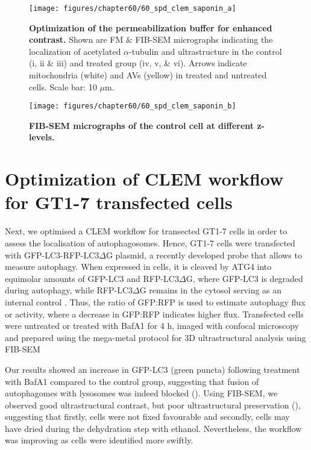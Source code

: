 \begin{landscape}
\begin{figure}[!htbp]
\center
 \texttt{[image: figures/chapter60/60\_spd\_clem\_saponin\_a]}
 \caption[Optimization of the permeabilization buffer for enhanced contrast]{\textbf{Optimization of the permeabilization buffer for enhanced contrast.} Shown are FM \& FIB-SEM micrographs indicating the localization of acetylated $\alpha$-tubulin and ultrastructure in the control (i, ii \& iii) and treated group (iv, v, \& vi). Arrows indicate mitochondria (white) and AVs (yellow) in treated and untreated cells. Scale bar: 10 $\mu$m.}
 \label{fig:60_spd_clem_saponin_a}
\end{figure} 
\end{landscape}

\begin{landscape}
\begin{figure}[!htbp]
\vspace{1.7cm}
\center
 \texttt{[image: figures/chapter60/60\_spd\_clem\_saponin\_b]}
 \caption[FIB-SEM micrographs of the control cell at different z-levels]{\textbf{FIB-SEM micrographs of the control cell at different z-levels.}}
 \label{fig:60_spd_clem_saponin_b}
\end{figure} 
\end{landscape}

\section{Optimization of CLEM workflow for GT1-7 transfected cells}
Next, we optimised a CLEM workflow for transected GT1-7 cells in order to assess the localisation of autophagosomes. Hence, GT1-7 cells were transfected with GFP-LC3-RFP-LC3$\Delta$G plasmid, a recently developed probe that allows to measure autophagy. When expressed in cells, it is cleaved by ATG4 into equimolar amounts of GFP-LC3 and RFP-LC3$\Delta$G, where GFP-LC3 is degraded during autophagy, while RFP-LC3$\Delta$G remains in the cytosol serving as an internal control \citep{Kaizuka2016}. Thus, the ratio of GFP:RFP is used to estimate autophagy flux or activity, where a decrease in GFP:RFP indicates higher flux. Transfected cells were untreated or treated with BafA1 for 4 h, imaged with confocal microscopy and prepared using the mega-metal protocol for 3D ultrastructural analysis using FIB-SEM

Our results showed an increase in GFP-LC3 (green puncta) following treatment with BafA1 compared to the control group, suggesting that fusion of autophagomes with lysosomes was indeed blocked (). Using FIB-SEM, we observed good ultrastructural contrast, but poor ultrastructural preservation (), suggesting that firstly, cells were not fixed favourable and secondly, cells may have dried during the dehydration step with ethanol. Nevertheless, the workflow was improving as cells were identified more swiftly.

